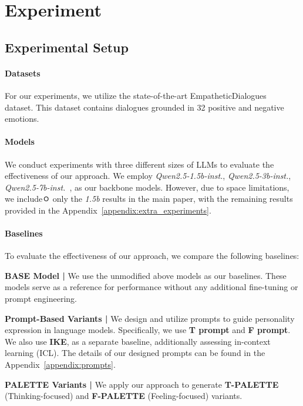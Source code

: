 \section{Experiment}
\subsection{Experimental Setup}
\paragraph{Datasets}
For our experiments, we utilize the state-of-the-art EmpatheticDialogues~\citep{empathetic_dialogues} dataset. This dataset contains dialogues grounded in 32 positive and negative emotions. 

\paragraph{Models}
We conduct experiments with three different sizes of LLMs to evaluate the effectiveness of our approach. We employ \textit{Qwen2.5-1.5b-inst.}, \textit{Qwen2.5-3b-inst.}, \textit{Qwen2.5-7b-inst.}~\citep{yang2024qwen2}, as our backbone models. However, due to space limitations, we includeㅇ only the \textit{1.5b} results in the main paper, with the remaining results provided in the Appendix~\ref{appendix:extra_experiments}.

\paragraph{Baselines}  
To evaluate the effectiveness of our approach, we compare the following baselines:  

    \noindent \textbf{BASE Model |} We use the unmodified above models as our baselines. These models serve as a reference for performance without any additional fine-tuning or prompt engineering.  

    \noindent \textbf{Prompt-Based Variants |}  We design and utilize prompts to guide personality expression in language models. Specifically, we use \textbf{T prompt} 
    and \textbf{F prompt}. 
    We also use \textbf{IKE}, 
    as a separate baseline, additionally assessing in-context learning (ICL). 
    The details of our designed prompts can be found in the Appendix~\ref{appendix:prompts}. 



    \noindent \textbf{PALETTE Variants |} We apply our approach to generate \textbf{T-PALETTE} (Thinking-focused) and \textbf{F-PALETTE} (Feeling-focused) variants.  

